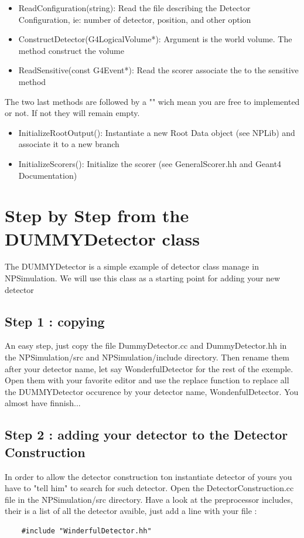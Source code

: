 \documentclass{book}
\begin{document}
	\begin{itemize}
		\item[] ReadConfiguration(string): Read the file describing the Detector Configuration, ie: number of detector, position, and other option
		\item[] ConstructDetector(G4LogicalVolume*): Argument is the world volume. The method construct the volume
		\item[] ReadSensitive(const G4Event*): Read the scorer associate the to the sensitive method
	\end{itemize}
	
The two last methods are followed by a "{}" wich mean you are free to implemented or not. If not they will remain empty.
	\begin{itemize}
		\item[] InitializeRootOutput(): Instantiate a new Root Data object (see NPLib) and associate it to a new branch
		\item[] InitializeScorers(): Initialize the scorer (see GeneralScorer.hh and Geant4 Documentation)
	\end{itemize}

\section{ Step by Step from the DUMMYDetector class}
	The DUMMYDetector is a simple example of detector class manage in NPSimulation. We will use this class as a starting point for adding your new detector

	\subsection{Step 1 : copying}
		An easy step, just copy the file DummyDetector.cc and DummyDetector.hh in the NPSimulation/src and NPSimulation/include directory. Then rename them after your detector name, let say WonderfulDetector for the rest of the exemple. Open them with your favorite editor and use the replace function to replace all the DUMMYDetector occurence by your detector name, WondenfulDetector. You almost have finnish...

	\subsection{Step 2 : adding your detector to the Detector Construction}
		In order to allow the detector construction ton instantiate detector of yours you have to "tell him" to search for such detector. Open the DetectorConstruction.cc file in the NPSimulation/src directory. Have a look at the preprocessor includes, their is a list of all the detector avaible, just add a line with your file :
	\begin{verbatim}
	#include "WinderfulDetector.hh"
	\end{verbatim}
\end{document}
